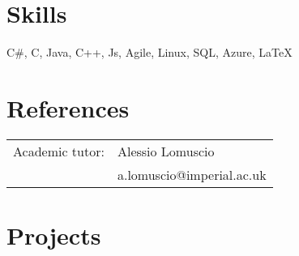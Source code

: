 \documentclass[a4paper,10pt]{article} %
\begin{document}
\begin{multicols}{2}
\section{Skills}
C\#, C, Java, C++, Js, Agile, Linux, SQL, Azure, \LaTeX

\section{References}

\begin{tabular}{rl}
Academic tutor: & Alessio Lomuscio\\
&a.lomuscio@imperial.ac.uk

\end{tabular}

\end{multicols}


\section{Projects}
\end{document}
